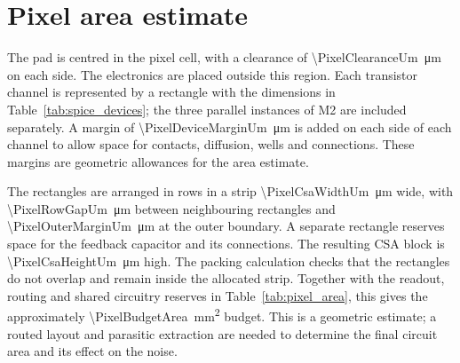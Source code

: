 \section{Pixel area estimate}
\label{app:pixel_area}

The pad is centred in the pixel cell, with a clearance of
\SI{\PixelClearanceUm}{\micro\metre} on each side. The electronics are placed
outside this region. Each transistor channel is represented by a rectangle
with the dimensions in Table~\ref{tab:spice_devices}; the three parallel
instances of M2 are included separately. A margin of
\SI{\PixelDeviceMarginUm}{\micro\metre} is added on each side of each channel
to allow space for contacts, diffusion, wells and connections. These margins
are geometric allowances for the area estimate.

The rectangles are arranged in rows in a strip
\SI{\PixelCsaWidthUm}{\micro\metre} wide, with
\SI{\PixelRowGapUm}{\micro\metre} between neighbouring rectangles and
\SI{\PixelOuterMarginUm}{\micro\metre} at the outer boundary. A separate
rectangle reserves space for the feedback capacitor and its connections.
The resulting CSA block is \SI{\PixelCsaHeightUm}{\micro\metre} high.
The packing calculation checks that the rectangles do not overlap and
remain inside the allocated strip. Together with the readout, routing and
shared circuitry reserves in Table~\ref{tab:pixel_area}, this gives the
approximately \SI{\PixelBudgetArea}{\milli\metre\squared} budget.
This is a geometric estimate; a routed layout and parasitic extraction are
needed to determine the final circuit area and its effect on the noise.
